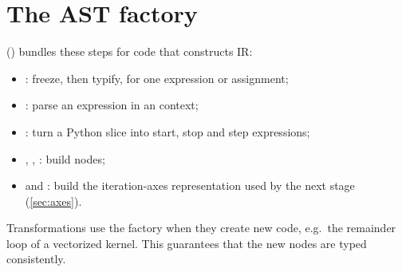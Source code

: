 \section{The AST factory}

 () bundles these steps for code that constructs IR:
\begin{itemize}
  \item {}: freeze, then typify, for one expression or assignment;
  \item {}: parse an expression in an  context;
  \item {}: turn a Python slice into start, stop
        and step expressions;
  \item {}, ,
        : build  nodes;
  \item {} and : build the
        iteration-axes representation used by the next stage (\cref{sec:axes}).
\end{itemize}
Transformations use the factory when they create new code, e.g.\ the remainder loop of a
vectorized kernel. This guarantees that the new nodes are typed consistently.
